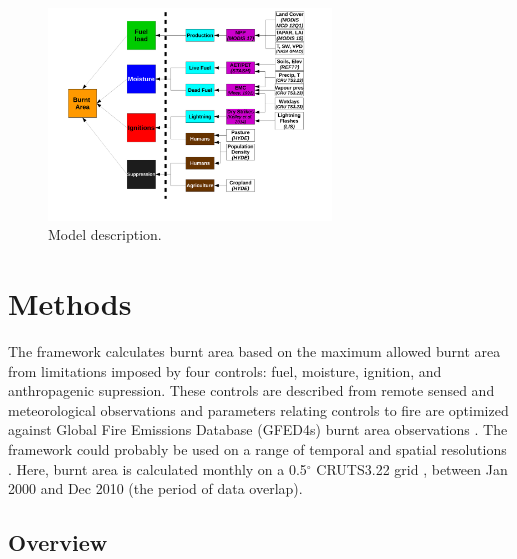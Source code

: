 \begin{figure}[!ht]
  \centering
    \includegraphics[width=0.67\textwidth]{Model_schematic.pdf}
  \caption{Model description.}
\end{figure}


\section{Methods}
The framework calculates burnt area based on the maximum allowed burnt area from limitations imposed by four controls: fuel, moisture, ignition, and anthropagenic supression. These controls are described from remote sensed and meteorological observations and parameters relating controls to fire are optimized against Global Fire Emissions Database (GFED4s) burnt area observations \citep{Giglio2013}.
The framework could probably be used on a range of temporal and spatial resolutions
.
Here, burnt area is calculated monthly on a 0.5$^{\circ}$ CRUTS3.22 grid \citep{harris2014cru}, between Jan 2000 and Dec 2010 (the period of data overlap).


\subsection{Overview}

